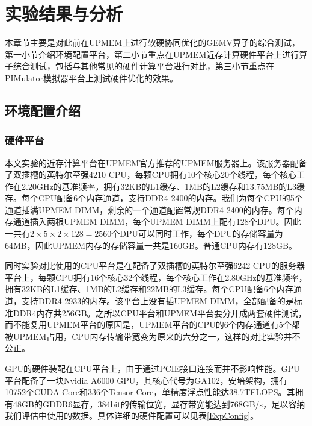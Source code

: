 \chapter{实验结果与分析}
本章节主要是对此前在UPMEM上进行软硬协同优化的GEMV算子的综合测试，第一小节介绍环境配置平台，第二小节重点在UPMEM近存计算硬件平台上进行算子综合测试，包括与其他常见的硬件计算平台进行对比，第三小节重点在PIMulator模拟器平台上测试硬件优化的效果。

\section{环境配置介绍}

\subsection{硬件平台}
本文实验的近存计算平台在UPMEM官方推荐的UPMEM服务器上。该服务器配备了双插槽的英特尔至强4210 CPU，每颗CPU拥有10个核心20个线程，每个核心工作在2.20GHz的基准频率，拥有32KB的L1缓存、1MB的L2缓存和13.75MB的L3缓存。每个CPU配备6个内存通道，支持DDR4-2400的内存。我们为每个CPU的5个通道插满UPMEM DIMM，剩余的一个通道配置常规DDR4-2400的内存。每个内存通道插入两根UPMEM DIMM，每个UPMEM DIMM上配有128个DPU。因此一共有$2\times 5\times 2\times 128=2560$个DPU可以同时工作，每个DPU的存储容量为64MB，因此UPMEM内存的存储容量一共是160GB。普通CPU内存有128GB。

同时实验对比使用的CPU平台是在配备了双插槽的英特尔至强6242 CPU的服务器平台上，每颗CPU拥有16个核心32个线程，每个核心工作在2.80GHz的基准频率，拥有32KB的L1缓存、1MB的L2缓存和22MB的L3缓存。每个CPU配备6个内存通道，支持DDR4-2933的内存。该平台上没有插UPMEM DIMM，全部配备的是标准DDR4内存共256GB。之所以CPU平台和UPMEM平台要分开成两套硬件测试，而不能复用UPMEM平台的原因是，UPMEM平台的CPU的6个内存通道有5个都被UPMEM占用，CPU内存传输带宽变为原来的六分之一，这样的对比实验并不公正。

GPU的硬件装配在CPU平台上，由于通过PCIE接口连接而并不影响性能。GPU平台配备了一块Nvidia A6000 GPU，其核心代号为GA102，安培架构，拥有10752个CUDA Core和336个Tensor Core，单精度浮点性能达38.7TFLOPS。其拥有48GB的GDDR6显存，384bit的传输位宽，显存带宽能达到768GB/s，足以容纳我们评估中使用的数据。具体详细的硬件配置可以见表\ref{ExpConfig}。

